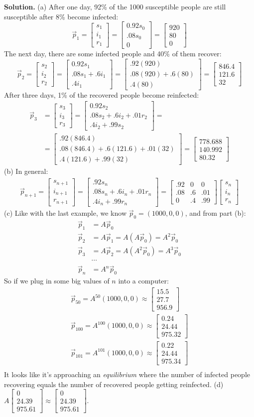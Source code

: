 \documentclass[11pt, letterpaper]{report}
\newenvironment{book}{}{}
\newcounter{example}[section]
\newcommand{\bbbvec}[3]{
  \begin{bmatrix} #1 \\ #2 \\ #3 \end{bmatrix}
}
\begin{document}
\begin{book}
\textbf{Solution.} (a) After one day, 92\% of the 1000 susceptible people are still susceptible after 8\% become infected:
\[\vec{p}_1=\bbbvec{s_1}{i_1}{r_1}=\bbbvec{0.92s_0}{.08s_0}{0} = \bbbvec{920}{80}{0} \]
The next day, there are some infected people and 40\% of them recover:
\[\vec{p}_2=\bbbvec{s_2}{i_2}{r_2}=\bbbvec{0.92s_1}{.08s_1 + .6i_1}{.4i_1} = \bbbvec{.92(920)}{.08(920)+.6(80)}{.4(80)} = \bbbvec{846.4}{121.6}{32} \]
After three days, 1\% of the recovered people become reinfected:
\begin{align*}
\vec{p}_3&=\bbbvec{s_3}{i_3}{r_3}=\bbbvec{0.92s_2}{.08s_2 + .6i_2 + .01r_2}{.4i_2+.99s_2} = \\ &=\bbbvec{.92(846.4)}{.08(846.4)+.6(121.6) + .01(32)}{.4(121.6)+.99(32)} = \bbbvec{778.688}{140.992}{80.32}
\end{align*}
(b) In general:
\begin{align*}
\vec{p}_{n+1} = \bbbvec{s_{n+1}}{i_{n+1}}{r_{n+1}} = \bbbvec{.92s_n}{.08s_n+.6i_n+.01r_n}{.4i_n+.99r_n} =
\begin{bmatrix}
.92 & 0 & 0 \\
.08 & .6 & .01 \\
0 & .4 & .99
\end{bmatrix}\bbbvec{s_n}{i_n}{r_n}
\end{align*}
(c) Like with the last example, we know $\vec{p}_0=(1000,0,0)$, and from part (b):
\begin{align*}
\vec{p}_1 &= A\vec{p}_0 \\
\vec{p}_2 &= A\vec{p}_1= A(A\vec{p}_0) = A^2\vec{p}_0 \\
\vec{p}_3 &= A\vec{p}_2= A(A^2\vec{p}_0) = A^3\vec{p}_0 \\
&\cdots \\
\vec{p}_n &= A^n\vec{p}_0
\end{align*}
So if we plug in some big values of $n$ into a computer:
\begin{align*}
\vec{p}_{50}=A^{50}(1000,0,0) \approx \bbbvec{15.5}{27.7}{956.9} \\
\vec{p}_{100}=A^{100}(1000,0,0) \approx \bbbvec{0.24}{24.44}{975.32} \\
\vec{p}_{101}=A^{101}(1000,0,0) \approx \bbbvec{0.22}{24.44}{975.34} \\
\end{align*}
It looks like it's approaching an \emph{equilibrium} where the number of infected people recovering equals the number of recovered people getting reinfected.
(d) $A \bbbvec{0}{24.39}{975.61} \approx \bbbvec{0}{24.39}{975.61}$. \blacksquare
\end{book}
\end{document}
